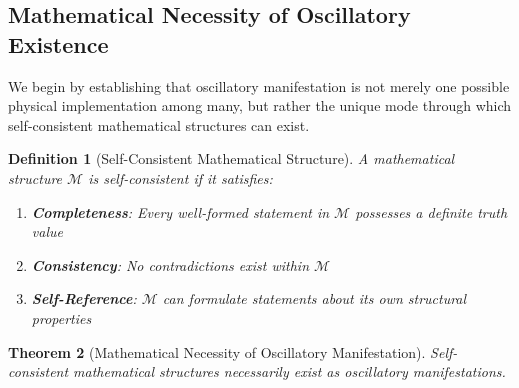 \documentclass[11pt]{article}
\newtheorem{theorem}{Theorem}[section]
\newtheorem{definition}[theorem]{Definition}
\theoremstyle{remark}
\begin{document}
\subsection{Mathematical Necessity of Oscillatory Existence}

We begin by establishing that oscillatory manifestation is not merely one possible physical implementation among many, but rather the unique mode through which self-consistent mathematical structures can exist.

\begin{definition}[Self-Consistent Mathematical Structure]
A mathematical structure $\mathcal{M}$ is self-consistent if it satisfies:
\begin{enumerate}
\item \textbf{Completeness}: Every well-formed statement in $\mathcal{M}$ possesses a definite truth value
\item \textbf{Consistency}: No contradictions exist within $\mathcal{M}$
\item \textbf{Self-Reference}: $\mathcal{M}$ can formulate statements about its own structural properties
\end{enumerate}
\end{definition}

\begin{theorem}[Mathematical Necessity of Oscillatory Manifestation]
\label{thm:oscillatory_necessity}
Self-consistent mathematical structures necessarily exist as oscillatory manifestations.
\end{theorem}
\end{document}
